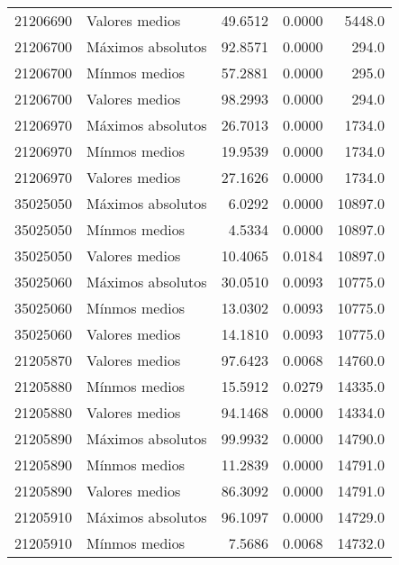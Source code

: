 \begin{longtable}{llrrr}
 21206690 &     Valores medios &       49.6512 &         0.0000 &          5448.0 \\
 21206700 &  Máximos absolutos &       92.8571 &         0.0000 &           294.0 \\
 21206700 &      Mínmos medios &       57.2881 &         0.0000 &           295.0 \\
 21206700 &     Valores medios &       98.2993 &         0.0000 &           294.0 \\
 21206970 &  Máximos absolutos &       26.7013 &         0.0000 &          1734.0 \\
 21206970 &      Mínmos medios &       19.9539 &         0.0000 &          1734.0 \\
 21206970 &     Valores medios &       27.1626 &         0.0000 &          1734.0 \\
 35025050 &  Máximos absolutos &        6.0292 &         0.0000 &         10897.0 \\
 35025050 &      Mínmos medios &        4.5334 &         0.0000 &         10897.0 \\
 35025050 &     Valores medios &       10.4065 &         0.0184 &         10897.0 \\
 35025060 &  Máximos absolutos &       30.0510 &         0.0093 &         10775.0 \\
 35025060 &      Mínmos medios &       13.0302 &         0.0093 &         10775.0 \\
 35025060 &     Valores medios &       14.1810 &         0.0093 &         10775.0 \\
 21205870 &     Valores medios &       97.6423 &         0.0068 &         14760.0 \\
 21205880 &      Mínmos medios &       15.5912 &         0.0279 &         14335.0 \\
 21205880 &     Valores medios &       94.1468 &         0.0000 &         14334.0 \\
 21205890 &  Máximos absolutos &       99.9932 &         0.0000 &         14790.0 \\
 21205890 &      Mínmos medios &       11.2839 &         0.0000 &         14791.0 \\
 21205890 &     Valores medios &       86.3092 &         0.0000 &         14791.0 \\
 21205910 &  Máximos absolutos &       96.1097 &         0.0000 &         14729.0 \\
 21205910 &      Mínmos medios &        7.5686 &         0.0068 &         14732.0 \\

\end{longtable}
